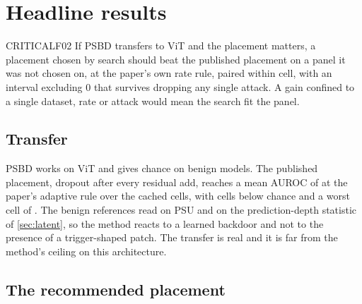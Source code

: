 \documentclass[../main.tex]{subfiles}
\begin{document}
\section{Headline results}

\begin{claim}{CRITICAL}{F02}
If PSBD transfers to ViT and the placement matters, a placement chosen by search should beat the published placement on a panel it was not chosen on, at the paper's own rate rule, paired within cell, with an interval excluding $0$ that survives dropping any single attack. A gain confined to a single dataset, rate or attack would mean the search fit the panel.
\end{claim}

\subsection{Transfer}

PSBD works on ViT and gives chance on benign models. The published placement, dropout after every residual add, reaches a mean AUROC of \PublishedAurocAdaptive{} at the paper's adaptive rule over the \PanelCellsCached{} cached cells, with \PublishedInversions{} cells below chance and a worst cell of \PublishedFloorAuroc{}. The benign references read \ConfidenceNullBenignPsu{} on PSU and \DepthBenignAuroc{} on the prediction-depth statistic of \cref{sec:latent}, so the method reacts to a learned backdoor and not to the presence of a trigger-shaped patch. The transfer is real and it is far from the method's ceiling on this architecture.

\subsection{The recommended placement}
\end{document}
